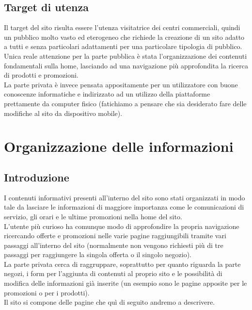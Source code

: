 \documentclass[a4paper,12pt]{article}
\begin{document}
\subsection{Target di utenza}
Il target del sito risulta essere l'utenza visitatrice dei centri commerciali, quindi un pubblico molto vasto ed eterogeneo che richiede la creazione di un sito adatto a tutti e senza particolari adattamenti per una particolare tipologia di pubblico.\\
Unica reale attenzione per la parte pubblica è stata l'organizzazione dei contenuti fondamentali sulla home, lasciando ad una navigazione più approfondita la ricerca di prodotti e promozioni.\\
La parte privata è invece pensata appositamente per un utilizzatore con buone conoscenze informatiche e indirizzato ad un utilizzo della piattaforme prettamente da computer fisico (fatichiamo a pensare che sia desiderato fare delle modifiche al sito da dispositivo mobile).
\section{Organizzazione delle informazioni}
\subsection{Introduzione}
I contenuti informativi presenti all'interno del sito sono stati organizzati in modo tale da lasciare le informazioni di maggiore importanza come le comunicazioni di servizio, gli orari e le ultime promozioni nella home del sito.\\
L'utente più curioso ha comunque modo di approfondire la propria navigazione ricercando offerte e promozioni nelle varie pagine raggiungibili tramite vari passaggi all'interno del sito (normalmente non vengono richiesti più di tre passaggi per raggiungere la singola offerta o il singolo negozio).\\
La parte privata cerca di raggruppare, soprattutto per quanto riguarda la parte negozi, i form per l'aggiunta di contenuti al proprio sito e le possibilità di modifica delle informazioni già inserite (un esempio sono le pagine apposite per le promozioni o per i prodotti).\\
Il sito si compone delle pagine che quì di seguito andremo a descrivere.
\end{document}
